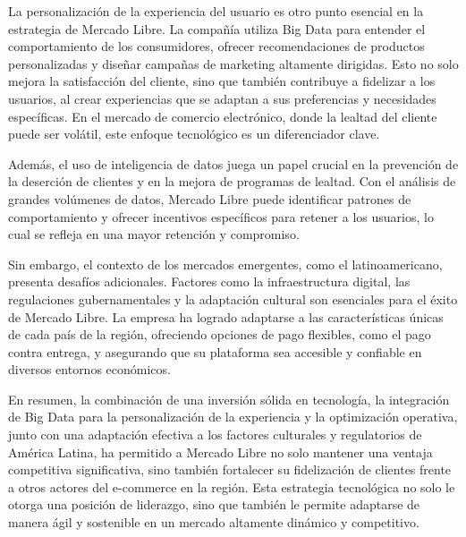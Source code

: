 \documentclass{article}
\begin{document}
La personalización de la experiencia del usuario es otro punto esencial
en la estrategia de Mercado Libre. La compañía utiliza Big Data para
entender el comportamiento de los consumidores, ofrecer recomendaciones
de productos personalizadas y diseñar campañas de marketing altamente
dirigidas. Esto no solo mejora la satisfacción del cliente, sino que
también contribuye a fidelizar a los usuarios, al crear experiencias que
se adaptan a sus preferencias y necesidades específicas. En el mercado
de comercio electrónico, donde la lealtad del cliente puede ser volátil,
este enfoque tecnológico es un diferenciador clave.

Además, el uso de inteligencia de datos juega un papel crucial en la
prevención de la deserción de clientes y en la mejora de programas de
lealtad. Con el análisis de grandes volúmenes de datos, Mercado Libre
puede identificar patrones de comportamiento y ofrecer incentivos
específicos para retener a los usuarios, lo cual se refleja en una mayor
retención y compromiso.

Sin embargo, el contexto de los mercados emergentes, como el
latinoamericano, presenta desafíos adicionales. Factores como la
infraestructura digital, las regulaciones gubernamentales y la
adaptación cultural son esenciales para el éxito de Mercado Libre. La
empresa ha logrado adaptarse a las características únicas de cada país
de la región, ofreciendo opciones de pago flexibles, como el pago contra
entrega, y asegurando que su plataforma sea accesible y confiable en
diversos entornos económicos.

En resumen, la combinación de una inversión sólida en tecnología, la
integración de Big Data para la personalización de la experiencia y la
optimización operativa, junto con una adaptación efectiva a los factores
culturales y regulatorios de América Latina, ha permitido a Mercado
Libre no solo mantener una ventaja competitiva significativa, sino
también fortalecer su fidelización de clientes frente a otros actores
del e-commerce en la región. Esta estrategia tecnológica no solo le
otorga una posición de liderazgo, sino que también le permite adaptarse
de manera ágil y sostenible en un mercado altamente dinámico y
competitivo.
\end{document}
